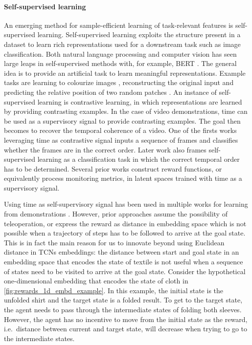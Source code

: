 \documentclass[\home/main.tex]{subfiles}
\begin{document}
\paragraph{Self-supervised learning}
An emerging method for sample-efficient learning of task-relevant features is self-supervised learning. Self-supervised learning exploits the structure present in a dataset to learn rich representations used for a downstream task such as image classification. Both natural language processing and computer vision has seen large leaps in self-supervised methods with, for example, BERT \autocite{Devlin2018}. The general idea is to provide an artificial task to learn meaningful representations. Example tasks are learning to colourize images \autocite{Zhang2016Color}, reconstructing the original input \autocite{Pathak2016} and predicting the relative position of two random patches \autocite{Doersch2015}. An instance of self-supervised learning is contrastive learning, in which representations are learned by providing contrasting examples. In the case of video demonstrations, time can be used as a supervisory signal to provide contrasting examples. The goal then becomes to recover the temporal coherence of a video. One of the firsts works leveraging time as contrastive signal \autocite{Misra2016} inputs a sequence of frames and classifies whether the frames are in the correct order. Later work \autocite{Lee2017,Fernando2017} also frames self-supervised learning as a classification task in which the correct temporal order has to be determined.
Several prior works construct reward functions, or equivalently process monitoring metrics, in latent spaces trained with time as a supervisory signal.

Using time as self-supervisory signal has been used in multiple works for learning from demonstrations \autocite{Nair2018time,Nair2018visual,Sermanet2017TCN,Dwibedi2018mfTCN,Hartikainen2019}. However, prior approaches assume the possibility of teleoperation, or express the reward as distance in embedding space which is not possible when a trajectory of steps has to be followed to arrive at the goal state. This is in fact the main reason for us to innovate beyond using Euclidean distance in \glspl{TCN} embeddings: the distance between start and goal state in an embedding space that encodes the state of textile is not useful when a sequence of states need to be visited to arrive at the goal state. Consider the hypothetical one-dimensional embedding that encodes the state of cloth in \cref{fig:rewards_1d_embd_example}. In this example, the initial state is the unfolded shirt and the target state is a folded result. To get to the target state, the agent needs to pass through the intermediate states of folding both sleeves. However, the agent has no incentive to move from the initial state as the reward, i.e.\ distance between current and target state, will decrease when trying to go to the intermediate states.
\end{document}
